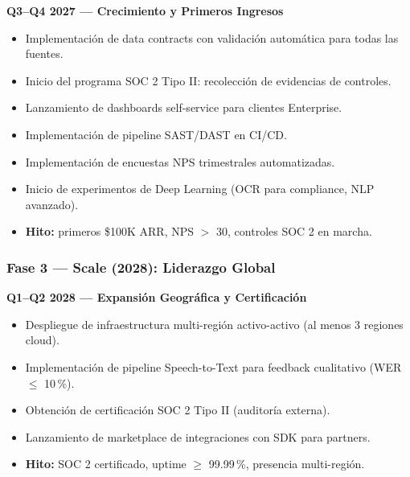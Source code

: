 ﻿\documentclass[11pt, letterpaper]{article}
\begin{document}
\textbf{Q3--Q4 2027 --- Crecimiento y Primeros Ingresos}

\begin{itemize}[leftmargin=1.5cm, label=\textbullet, itemsep=2pt, topsep=4pt]

    \item Implementación de data contracts con validación automática para todas las fuentes.

    \item Inicio del programa SOC 2 Tipo II: recolección de evidencias de controles.

    \item Lanzamiento de dashboards self-service para clientes Enterprise.

    \item Implementación de pipeline SAST/DAST en CI/CD.

    \item Implementación de encuestas NPS trimestrales automatizadas.

    \item Inicio de experimentos de Deep Learning (OCR para compliance, NLP avanzado).

    \item \textbf{Hito:} primeros \$100K ARR, NPS $>$ 30, controles SOC 2 en marcha.

\end{itemize}



\subsubsection{Fase 3 --- Scale (2028): Liderazgo Global}



\textbf{Q1--Q2 2028 --- Expansión Geográfica y Certificación}

\begin{itemize}[leftmargin=1.5cm, label=\textbullet, itemsep=2pt, topsep=4pt]

    \item Despliegue de infraestructura multi-región activo-activo (al menos 3 regiones cloud).

    \item Implementación de pipeline Speech-to-Text para feedback cualitativo (WER $\le$ 10\,\%).

    \item Obtención de certificación SOC 2 Tipo II (auditoría externa).

    \item Lanzamiento de marketplace de integraciones con SDK para partners.

    \item \textbf{Hito:} SOC 2 certificado, uptime $\ge$ 99.99\,\%, presencia multi-región.

\end{itemize}
\end{document}
